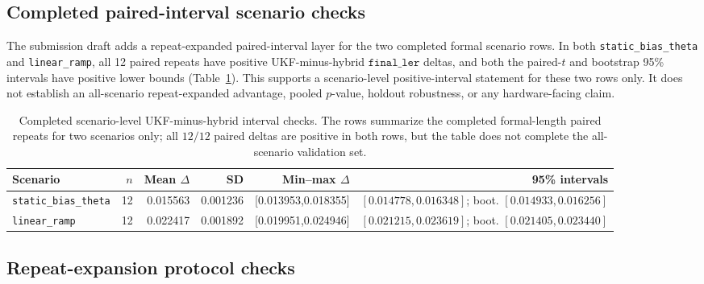 \documentclass[11pt]{article}
\begin{document}
\subsection{Completed paired-interval scenario checks}

The submission draft adds a repeat-expanded paired-interval layer for the
two completed formal scenario rows.  In both
\texttt{static\_bias\_theta} and \texttt{linear\_ramp}, all 12 paired repeats
have positive UKF-minus-hybrid \(\texttt{final\_ler}\) deltas, and both the
paired-\(t\) and bootstrap 95\% intervals have positive lower bounds
(Table~\ref{tab:paired-interval-note}).  This supports a scenario-level
positive-interval statement for these two rows only.  It does not establish an
all-scenario repeat-expanded advantage, pooled \(p\)-value, holdout robustness,
or any hardware-facing claim.

\begin{table}[ht]
\centering
\scriptsize
\setlength{\tabcolsep}{3pt}
\begin{tabular}{lrrrrr}
\toprule
Scenario & \(n\) & Mean \(\Delta\) & SD & Min--max \(\Delta\) & 95\% intervals \\
\midrule
\texttt{static\_bias\_theta} & 12 & 0.015563 & 0.001236 & [0.013953,0.018355] &
\([0.014778,0.016348]\); boot. \([0.014933,0.016256]\) \\
\texttt{linear\_ramp} & 12 & 0.022417 & 0.001892 & [0.019951,0.024946] &
\([0.021215,0.023619]\); boot. \([0.021405,0.023440]\) \\
\bottomrule
\end{tabular}
\caption{Completed scenario-level UKF-minus-hybrid interval checks.  The
rows summarize the completed formal-length paired repeats for two scenarios
only; all \(12/12\) paired deltas are positive in both rows, but the table
does not complete the all-scenario validation set.}
\label{tab:paired-interval-note}
\end{table}

\subsection{Repeat-expansion protocol checks}
\end{document}
